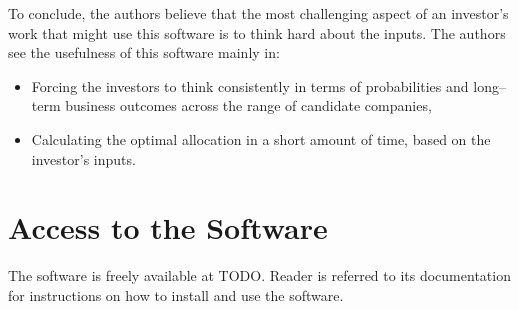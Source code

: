 \documentclass{article}
\begin{document}
\indent To conclude, the authors believe that the most challenging aspect of an
investor's work that might use this software is to think hard about the inputs.
The authors see the usefulness of this software mainly in:
\begin{itemize}
    \item Forcing the investors to think consistently in terms of probabilities
    and long--term business outcomes across the range of candidate companies,
    \item Calculating the optimal allocation in a short amount of time, based on
    the investor's inputs.
\end{itemize}

\section{Access to the Software}

\noindent The software is freely available at TODO. Reader is referred to its
documentation for instructions on how to install and use the software.

\clearpage



\end{document}
